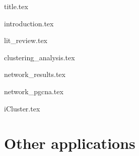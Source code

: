 \documentclass[a4paper, 12pt]{article}
\begin{document}
{title.tex}



\setcounter{tocdepth}{1} %
\setcounter{tocdepth}{2} %
\setcounter{tocdepth}{3} %
\setcounter{tocdepth}{4} %

\tableofcontents

\newpage

\listoffigures

\listoftables


\newpage

\printglossary[type=acronym] 


\newpage

{introduction.tex}

\newpage

\newpage

{lit_review.tex}

\newpage

{clustering_analysis.tex}





{network_results.tex}

{network_pgcna.tex}


\newpage

{iCluster.tex}

\newpage


\section{Other applications}

\newpage



 

    
\end{document}
